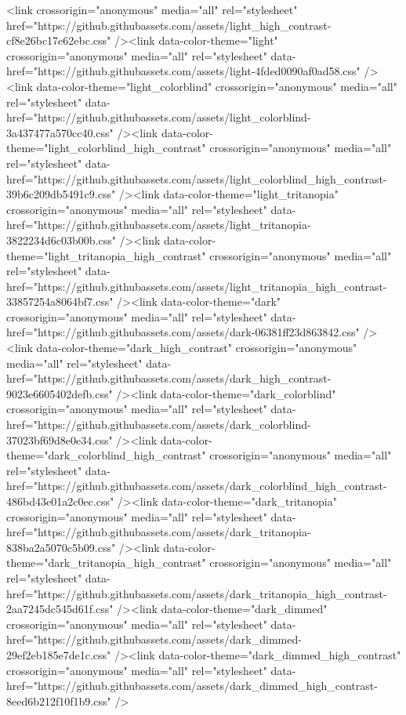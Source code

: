   <link crossorigin="anonymous" media="all" rel="stylesheet" href="https://github.githubassets.com/assets/light_high_contrast-cf8e26bc17e62ebc.css" /><link data-color-theme="light" crossorigin="anonymous" media="all" rel="stylesheet" data-href="https://github.githubassets.com/assets/light-4fded0090af0ad58.css" /><link data-color-theme="light_colorblind" crossorigin="anonymous" media="all" rel="stylesheet" data-href="https://github.githubassets.com/assets/light_colorblind-3a437477a570cc40.css" /><link data-color-theme="light_colorblind_high_contrast" crossorigin="anonymous" media="all" rel="stylesheet" data-href="https://github.githubassets.com/assets/light_colorblind_high_contrast-39b6c209db5491c9.css" /><link data-color-theme="light_tritanopia" crossorigin="anonymous" media="all" rel="stylesheet" data-href="https://github.githubassets.com/assets/light_tritanopia-3822234d6c03b00b.css" /><link data-color-theme="light_tritanopia_high_contrast" crossorigin="anonymous" media="all" rel="stylesheet" data-href="https://github.githubassets.com/assets/light_tritanopia_high_contrast-33857254a8064bf7.css" /><link data-color-theme="dark" crossorigin="anonymous" media="all" rel="stylesheet" data-href="https://github.githubassets.com/assets/dark-06381ff23d863842.css" /><link data-color-theme="dark_high_contrast" crossorigin="anonymous" media="all" rel="stylesheet" data-href="https://github.githubassets.com/assets/dark_high_contrast-9023e6605402defb.css" /><link data-color-theme="dark_colorblind" crossorigin="anonymous" media="all" rel="stylesheet" data-href="https://github.githubassets.com/assets/dark_colorblind-37023bf69d8e0e34.css" /><link data-color-theme="dark_colorblind_high_contrast" crossorigin="anonymous" media="all" rel="stylesheet" data-href="https://github.githubassets.com/assets/dark_colorblind_high_contrast-486bd43e01a2c0ec.css" /><link data-color-theme="dark_tritanopia" crossorigin="anonymous" media="all" rel="stylesheet" data-href="https://github.githubassets.com/assets/dark_tritanopia-838ba2a5070c5b09.css" /><link data-color-theme="dark_tritanopia_high_contrast" crossorigin="anonymous" media="all" rel="stylesheet" data-href="https://github.githubassets.com/assets/dark_tritanopia_high_contrast-2aa7245dc545d61f.css" /><link data-color-theme="dark_dimmed" crossorigin="anonymous" media="all" rel="stylesheet" data-href="https://github.githubassets.com/assets/dark_dimmed-29ef2eb185e7de1c.css" /><link data-color-theme="dark_dimmed_high_contrast" crossorigin="anonymous" media="all" rel="stylesheet" data-href="https://github.githubassets.com/assets/dark_dimmed_high_contrast-8eed6b212f10f1b9.css" />


